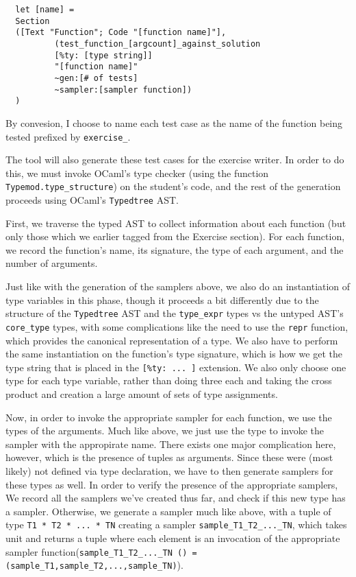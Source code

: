 \documentclass[11pt]{article} %
\begin{document}
\begin{lstlisting}
  let [name] =
  Section
  ([Text "Function"; Code "[function name]"],
          (test_function_[argcount]_against_solution
          [%ty: [type string]]
          "[function name]"
          ~gen:[# of tests]
          ~sampler:[sampler function])
  )
\end{lstlisting}

By convesion, I choose to name each test case as the name of the function being tested prefixed by \verb+exercise_+. 

The tool will also generate these test cases for the exercise writer. In order to do this, we must invoke OCaml's type checker (using the function \verb+Typemod.type_structure+) on the student's code, and the rest of the generation proceeds using OCaml's \verb+Typedtree+ AST.

First, we traverse the typed AST to collect information about each function (but only those which we earlier tagged from the Exercise section). For each function, we record the function's name, its signature, the type of each argument, and the number of arguments.

Just like with the generation of the samplers above, we also do an instantiation of type variables in this phase, though it proceeds a bit differently due to the structure of the \verb+Typedtree+ AST and the \verb+type_expr+ types vs the untyped AST's \verb+core_type+ types, with some complications like the need to use the \verb+repr+ function, which provides the canonical representation of a type. We also have to perform the same instantiation on the function's type signature, which is how we get the type string that is placed in the \verb+[%ty: ... ]+ extension. We also only choose one type for each type variable, rather than doing three each and taking the cross product and creation a large amount of sets of type assignments.

Now, in order to invoke the appropriate sampler for each function, we use the types of the arguments. Much like above, we just use the type to invoke the sampler with the appropirate name. There exists one major complication here, however, which is the presence of tuples as arguments. Since these were (most likely) not defined via type declaration, we have to then generate samplers for these types as well. In order to verify the presence of the appropriate samplers, We record all the samplers we've created thus far, and check if this new type has a sampler. Otherwise, we generate a sampler much like above, with a tuple of type \verb+T1 * T2 * ... * TN+ creating a sampler \verb+sample_T1_T2_..._TN+, which takes unit and returns a tuple where each element is an invocation of the appropriate sampler function(\verb+sample_T1_T2_..._TN () = (sample_T1,sample_T2,...,sample_TN)+).
\end{document}
